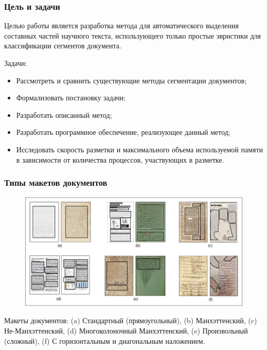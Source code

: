 \documentclass[gray]{beamer}
\begin{document}
\begin{frame}
    \frametitle{Цель и задачи}
    Целью работы является разработка метода для автоматического выделения составных частей научного текста, использующего только простые эвристики для классификации сегментов документа.

    Задачи:
    \begin{itemize}
        \item Рассмотреть и сравнить существующие методы сегментации документов;
        \item Формализовать постановку задачи;
        \item Разработать описанный метод;
        \item Разработать программное обеспечение, реализующее данный метод;
        \item Исследовать скорость разметки и максимального объема используемой памяти в зависимости от количества процессов, участвующих в разметке.
    \end{itemize}
    
\end{frame}

\begin{frame}
    \frametitle{Типы макетов документов}

\begin{figure}[H]
	\centering
    \includegraphics[width=\textwidth]{img/layouts.png}
\end{figure}

    Макеты документов: (a) Стандартный (прямоугольный), (b) Манхэттенский, (c) Не-Манхэттенский, (d) Многоколоночный Манхэттенский, (e) Произвольный (сложный), (f) С горизонтальным и диагональным наложением.

\end{frame}
\end{document}
